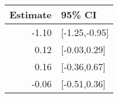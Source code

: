 \begin{tabular}{rl}
  \hline
Estimate & 95\% CI \\ 
  \hline
-1.10 & [-1.25,-0.95] \\ 
  0.12 & [-0.03,0.29] \\ 
  0.16 & [-0.36,0.67] \\ 
  -0.06 & [-0.51,0.36] \\ 
   \hline
\end{tabular}

